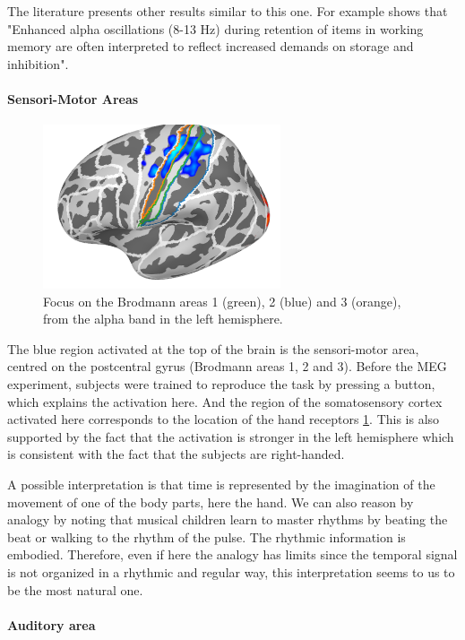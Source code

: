 The literature presents other results similar to this one. For example \cite{obleser2012adverse} shows that "Enhanced alpha oscillations (8-13 Hz) during retention of items in working memory are often interpreted to reflect increased demands on storage and inhibition".

\paragraph{Sensori-Motor Areas}

\begin{figure}[ht]
    \centering
    \includegraphics[width=7cm]{images_report/source/brodmann_alpha.png}
    \caption[Focus on the Brodmann areas]%
    {Focus on the Brodmann areas 1 (green), 2 (blue) and 3 (orange), from the alpha band in the left hemisphere.}
    \label{brodmann_alpha}
\end{figure}

The blue region activated at the top of the brain is the sensori-motor area, centred on the postcentral gyrus (Brodmann areas 1, 2 and 3). Before the MEG experiment, subjects were trained to reproduce the task by pressing a button, which explains the activation here. And the region of the somatosensory cortex activated here corresponds to the location of the hand receptors \ref{brodmann_alpha}. This is also supported by the fact that the activation is stronger in the left hemisphere which is consistent with the fact that the subjects are right-handed.

A possible interpretation is that time is represented by the imagination of the movement of one of the body parts, here the hand. We can also reason by analogy by noting that musical children learn to master rhythms by beating the beat or walking to the rhythm of the pulse. The rhythmic information is embodied. Therefore, even if here the analogy has limits since the temporal signal is not organized in a rhythmic and regular way, this interpretation seems to us to be the most natural one.

\paragraph{Auditory area}

